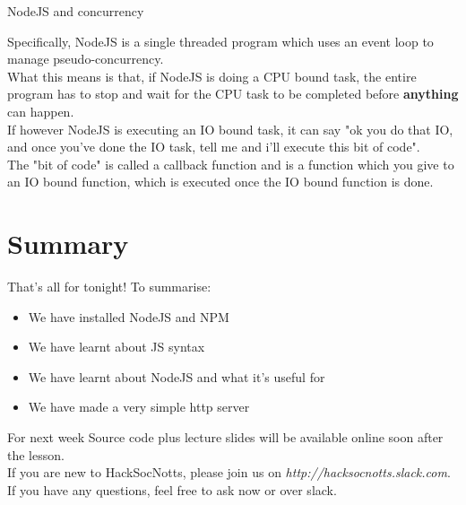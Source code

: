 \documentclass{beamer}
\begin{document}
\begin{frame}{NodeJS and concurrency}

Specifically, NodeJS is a single threaded program which uses an event loop to manage pseudo-concurrency. \\
\pause
What this means is that, if NodeJS is doing a CPU bound task, the entire program has to stop and wait for the CPU task to be completed before \textbf{anything} can happen.\\
\pause
If however NodeJS is executing an IO bound task, it can say "ok you do that IO, and once you've done the IO task, tell me and i'll execute this bit of code".\\
\pause
The "bit of code" is called a callback function and is a function which you give to an IO bound function, which is executed once the IO bound function is done.

\end{frame}

\begin{frame}



\end{frame}

\section{Summary}

\begin{frame}{That's all for tonight!}
  To summarise:
  \begin{itemize}
  \item We have installed NodeJS and NPM
  \item We have learnt about JS syntax
  \item We have learnt about NodeJS and what it's useful for
  \item We have made a very simple http server
  \end{itemize}
\end{frame}

\begin{frame}{For next week}
Source code plus lecture slides will be available online soon after the lesson.\\
If you are new to HackSocNotts, please join us on \textit{http://hacksocnotts.slack.com}.\\
If you have any questions, feel free to ask now or over slack.\\
\end{frame}
\end{document}
